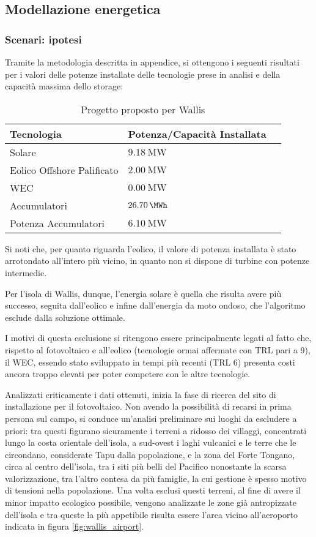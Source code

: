 \documentclass[fleqn,11pt]{SelfArx} %
\begin{document}
\subsection{Modellazione energetica}

\subsubsection{Scenari: ipotesi}
Tramite la metodologia descritta in appendice, si ottengono i seguenti risultati per i valori delle potenze installate delle tecnologie prese in analisi e della capacità massima dello storage:
\begin{table}[H]
	\caption{Progetto proposto per Wallis}
	\centering
	\begin{tabular}{llc}
		\toprule
		Tecnologia   & Potenza/Capacità Installata \\
		\midrule
		Solare       & \(\SI{9.18}{\MW}\)         \\
		Eolico Offshore Palificato & \(\SI{2.00}{\MW}\) \\
		WEC          & \(\SI{0.00}{\MW}\)         \\
		Accumulatori & \(\SI{26.70}{\MWh}\)        \\
		Potenza Accumulatori & \(\SI{6.10}{\MW}\)   \\
		\bottomrule
	\end{tabular}
	\label{tab:wallis_project}
\end{table}

Si noti che, per quanto riguarda l'eolico, il valore di potenza installata è stato arrotondato all'intero più vicino, in quanto non si dispone di turbine con potenze intermedie.

Per l'isola di Wallis, dunque, l'energia solare è quella che risulta avere più successo, seguita dall'eolico e infine dall'energia da moto ondoso, che l'algoritmo esclude dalla soluzione ottimale.

I motivi di questa esclusione si ritengono essere principalmente legati al fatto che, rispetto al fotovoltaico e all'eolico (tecnologie ormai affermate con TRL pari a 9), il WEC, essendo stato sviluppato in tempi più recenti (TRL 6) presenta costi ancora troppo elevati per poter competere con le altre tecnologie.

Analizzati criticamente i dati ottenuti, inizia la fase di ricerca del sito di installazione per il fotovoltaico. 
Non avendo la possibilità di recarsi in prima persona sul campo, si conduce un'analisi preliminare sui luoghi da escludere a priori: tra questi figurano sicuramente i terreni a ridosso dei villaggi, concentrati lungo la costa orientale dell'isola, a sud-ovest i laghi vulcanici e le terre che le circondano, considerate Tapu dalla popolazione, e la zona del Forte Tongano, circa al centro dell'isola, tra i siti più belli del Pacifico nonostante la scarsa valorizzazione, tra l'altro contesa da più famiglie, la cui gestione è spesso motivo di tensioni nella popolazione.
Una volta esclusi questi terreni, al fine di avere il minor impatto ecologico possibile, vengono analizzate le zone già antropizzate dell'isola e tra queste la più appetibile risulta essere l'area vicino all'aeroporto indicata in figura \ref{fig:wallis_airport}.
\end{document}
